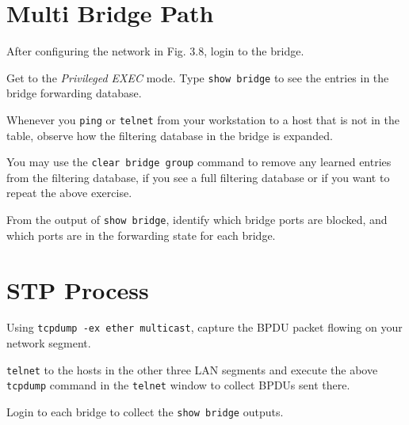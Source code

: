 \documentclass{../UTNetLab}
\begin{document}
\section{Multi Bridge Path}
    After configuring the network in Fig. 3.8, login to the bridge.

    Get to the \textit{Privileged EXEC} mode. Type \lstinline[language={cisco}]{show bridge} to see the entries in the bridge forwarding database.

    Whenever you \lstinline{ping} or \lstinline{telnet} from your workstation to a host that is not in the table, observe how the filtering database in the bridge is expanded.

    You may use the \lstinline[language={cisco}, emph={group}]{clear bridge group} command to remove any learned entries from the filtering database, if you see a full filtering database or if you want to repeat the above exercise.

    \begin{report}
    \item From the output of \lstinline{show bridge}, identify which bridge ports are blocked, and which ports are in the forwarding state for each bridge.
    \end{report}

\section{STP Process}
    Using \lstinline{tcpdump -ex ether multicast}, capture the BPDU packet flowing on your network segment.

    \lstinline{telnet} to the hosts in the other three LAN segments and execute the above \lstinline{tcpdump} command in the \lstinline{telnet} window to collect BPDUs sent there.

    Login to each bridge to collect the \lstinline[language={cisco}]{show bridge} outputs.
    
\end{document}

